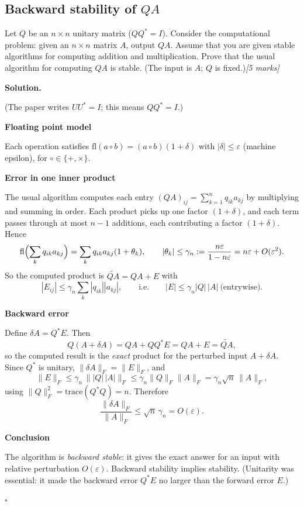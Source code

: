 \documentclass[11pt,a4paper]{article}
\newenvironment{solution}
  {\par\noindent\textbf{Solution.}\par\nobreak}
  {\par\hfill\(\square\)\par}
\newcommand{\step}[1]{\par\addvspace{0.5em}\noindent\textbf{#1}\par\nobreak}
\newcommand{\mk}[1]{\hfill\textit{[#1 marks]}}
\newcommand{\norm}[1]{\lVert#1\rVert}
\begin{document}
\subsection{Backward stability of \(QA\)}

\begin{qbox}
Let \(Q\) be an \(n\times n\) unitary matrix (\(QQ^*=I\)).  Consider the
computational problem: given an \(n\times n\) matrix \(A\), output
\(QA\).  Assume that you are given stable algorithms for computing
addition and multiplication.  Prove that the usual algorithm for
computing \(QA\) is stable.  (The input is \(A\); \(Q\) is fixed.)\mk{5}
\end{qbox}

\begin{solution}
(The paper writes \(UU^*=I\); this means \(QQ^*=I\).)

\step{Floating point model}
Each operation satisfies \(\mathrm{fl}(a\circ b)=(a\circ b)(1+\delta)\)
with \(|\delta|\le\varepsilon\) (machine epsilon), for
\(\circ\in\{+,\times\}\).

\step{Error in one inner product}
The usual algorithm computes each entry
\((QA)_{ij}=\sum_{k=1}^nq_{ik}a_{kj}\) by multiplying and summing in
order.  Each product picks up one factor \((1+\delta)\), and each term
passes through at most \(n-1\) additions, each contributing a factor
\((1+\delta)\).  Hence
\[
  \mathrm{fl}\Bigl(\sum_kq_{ik}a_{kj}\Bigr)=\sum_kq_{ik}a_{kj}(1+\theta_k),
  \qquad |\theta_k|\le\gamma_n:=\frac{n\varepsilon}{1-n\varepsilon}
  =n\varepsilon+O(\varepsilon^2).
\]
So the computed product is \(\widetilde{QA}=QA+E\) with
\[
  |E_{ij}|\le\gamma_n\sum_k|q_{ik}||a_{kj}|,
  \qquad\text{i.e.}\qquad |E|\le\gamma_n|Q|\,|A|\ \text{(entrywise)}.
\]

\step{Backward error}
Define \(\delta A=Q^*E\).  Then
\[
  Q(A+\delta A)=QA+QQ^*E=QA+E=\widetilde{QA},
\]
so the computed result is the \emph{exact} product for the perturbed
input \(A+\delta A\).  Since \(Q^*\) is unitary,
\(\norm{\delta A}_F=\norm{E}_F\), and
\[
  \norm{E}_F\le\gamma_n\,\bigl\lVert|Q|\,|A|\bigr\rVert_F
  \le\gamma_n\norm{Q}_F\norm{A}_F=\gamma_n\sqrt n\,\norm A_F,
\]
using \(\norm{Q}_F^2=\mathrm{trace}(Q^*Q)=n\).  Therefore
\[
  \frac{\norm{\delta A}_F}{\norm A_F}\le\sqrt n\,\gamma_n=O(\varepsilon).
\]

\step{Conclusion}
The algorithm is \emph{backward stable}: it gives the exact answer for
an input with relative perturbation \(O(\varepsilon)\).  Backward
stability implies stability.  (Unitarity was essential: it made the
backward error \(Q^*E\) no larger than the forward error \(E\).)
\end{solution}
\end{document}
